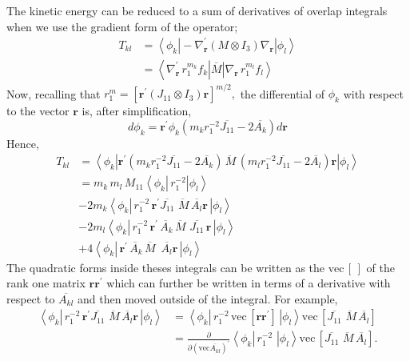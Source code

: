 \documentclass[12pt]{article}
\begin{document}
The kinetic energy can be reduced to a sum of derivatives of overlap integrals
when we use the gradient form of the operator;
\begin{align}
T_{kl}  & =\left\langle \phi_{k}\right|  -\nabla_{\mathbf{r}}^{\prime}\left(
M\otimes I_{3}\right)  \nabla_{\mathbf{r}}\left|  \phi_{l}\right\rangle \\
& =\left\langle \nabla_{\mathbf{r}}^{\prime}\,r_{1}^{m_{k}}f_{k}\right|
\overline{M}\left|  \nabla_{\mathbf{r}}\,r_{1}^{m_{l}}f_{l}\right\rangle
\nonumber
\end{align}
Now, recalling that $r_{1}^{m}=\left[  \mathbf{r}^{\prime}(J_{11}\otimes
I_{3})\mathbf{r}\right]  ^{m/2},$ the differential of $\phi_{k}$ with respect
to the vector $\mathbf{r}$ is, after simplification,
\begin{equation}
d\phi_{k}=\mathbf{r}^{\prime}\phi_{k}\left(  m_{k}r_{1}^{-2}\overline{J_{11}%
}-2\overline{A_{k}}\right)  d\mathbf{r}%
\end{equation}
Hence,
\begin{align}
T_{kl}  & =\left\langle \phi_{k}\right|  \mathbf{r}^{\prime}\left(  m_{k}%
r_{1}^{-2}\overline{J_{11}}-2\overline{A_{k}}\right)  \overline{\,M}\,\left(
m_{l}r_{1}^{-2}\overline{J_{11}}-2\overline{A_{l}}\right)  \mathbf{r}\left|
\phi_{l}\right\rangle \\
& =m_{k}\,m_{l}\,M_{11}\left\langle \phi_{k}\right|  \,r_{1}^{-2}\left|
\phi_{l}\right\rangle \\
& -2m_{k}\left\langle \phi_{k}\right|  \,r_{1}^{-2}\,\mathbf{r}^{\prime
}\overline{J_{11}}\,\overline{\,M}\,\overline{A_{l}}\mathbf{r\,}\left|
\phi_{l}\right\rangle \\
& -2m_{l}\left\langle \phi_{k}\right|  \,r_{1}^{-2}\,\mathbf{r}^{\prime
}\overline{\,A_{k}}\,\overline{M}\,\,\overline{J_{11}}\,\mathbf{r\,}\left|
\phi_{l}\right\rangle \\
& +4\left\langle \phi_{k}\right|  \,\mathbf{r}^{\prime}\overline{\,A_{k}%
}\,\overline{M}\,\,\,\overline{A_{l}}\mathbf{r\,}\left|  \phi_{l}%
\right\rangle
\end{align}
The quadratic forms inside theses integrals can be written as the
$\mathrm{vec}\,\left[  \,\right]  $ of the rank one matrix $\mathbf{rr}%
^{\prime}$ which can further be written in terms of a derivative with respect
to $\overline{A_{kl}}$ and then moved outside of the
integral\cite{Kinghorn95a}. For example,
\begin{align}
\left\langle \phi_{k}\right|  \,r_{1}^{-2}\,\mathbf{r}^{\prime}\overline
{J_{11}}\,\overline{\,M}\,\overline{A_{l}}\mathbf{r\,}\left|  \phi
_{l}\right\rangle  & =\left\langle \phi_{k}\right|  \,r_{1}^{-2}%
\,\mathrm{vec}\,\left[  \mathbf{rr}^{\prime}\right]  \mathbf{\,}\left|
\phi_{l}\right\rangle \mathrm{vec}\,\left[  \overline{J_{11}}\,\overline
{\,M}\,\overline{A_{l}}\right] \\
& =\frac{\partial}{\partial\left(  \mathrm{vec}\overline{A_{kl}}\right)
^{\prime}}\left\langle \phi_{k}\right|  \,r_{1}^{-2}\,\mathbf{\,}\left|
\phi_{l}\right\rangle \mathrm{vec}\,\left[  \overline{J_{11}}\,\overline
{\,M}\,\overline{A_{l}}\right]  .
\end{align}
\end{document}
